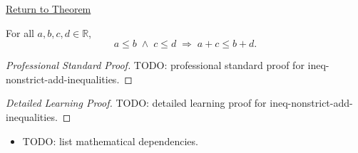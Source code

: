 \newpage
{}
\label{prf:ineq-nonstrict-add-inequalities}

\begin{remark*}[Return]
\hyperref[thm:ineq-nonstrict-add-inequalities]{Return to Theorem}
\end{remark*}

\begin{theorem*}
For all $a, b, c, d \in \mathbb{R}$,
\[
  a \le b \;\land\; c \le d \;\Rightarrow\; a + c \le b + d.
\]
\end{theorem*}

\begin{proof}[Professional Standard Proof]
\LRAProofBodyStart
TODO: professional standard proof for ineq-nonstrict-add-inequalities.
\end{proof}

\begin{proof}[Detailed Learning Proof]
\LRAProofBodyStart
TODO: detailed learning proof for ineq-nonstrict-add-inequalities.
\end{proof}

\begin{remark*}
\end{remark*}

\begin{dependencies}
\begin{itemize}
  \item TODO: list mathematical dependencies.
\end{itemize}
\end{dependencies}

\clearpage
